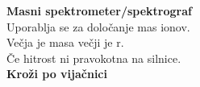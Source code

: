 \textbf{Masni spektrometer/spektrograf}\\
Uporablja se za določanje mas ionov.\\
{\color{bostonuniversityred}Večja je masa večji je r.}\\
Če hitrost ni pravokotna na silnice.\\
\textbf{Kroži po vijačnici}\\